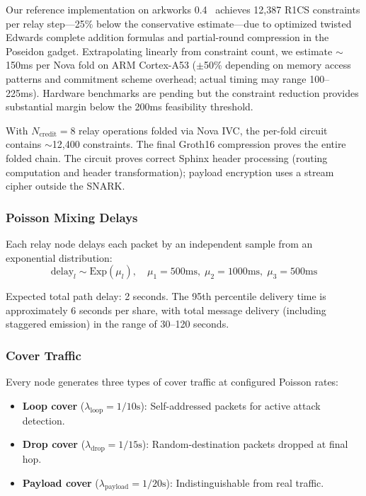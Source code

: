 \documentclass[11pt,a4paper]{article}
\begin{document}
Our reference implementation on arkworks 0.4~\cite{arkworks} achieves 12,387 R1CS constraints per relay step---25\% below the conservative estimate---due to optimized twisted Edwards complete addition formulas and partial-round compression in the Poseidon gadget. Extrapolating linearly from constraint count, we estimate $\sim$150ms per Nova fold on ARM Cortex-A53 ($\pm$50\% depending on memory access patterns and commitment scheme overhead; actual timing may range 100--225ms). Hardware benchmarks are pending but the constraint reduction provides substantial margin below the 200ms feasibility threshold.

With $N_{\text{credit}} = 8$ relay operations folded via Nova IVC, the per-fold circuit contains $\sim$12,400 constraints. The final Groth16 compression proves the entire folded chain. The circuit proves correct Sphinx header processing (routing computation and header transformation); payload encryption uses a stream cipher outside the SNARK.

\subsubsection{Poisson Mixing Delays}

Each relay node delays each packet by an independent sample from an exponential distribution:
\begin{equation}
    \text{delay}_l \sim \text{Exp}(\mu_l), \quad \mu_1 = 500\text{ms}, \; \mu_2 = 1000\text{ms}, \; \mu_3 = 500\text{ms}
\end{equation}

Expected total path delay: 2 seconds. The 95th percentile delivery time is approximately 6 seconds per share, with total message delivery (including staggered emission) in the range of 30--120 seconds.

\subsubsection{Cover Traffic}

Every node generates three types of cover traffic at configured Poisson rates:

\begin{itemize}[nosep]
    \item \textbf{Loop cover} ($\lambda_{\text{loop}} = 1/10\text{s}$): Self-addressed packets for active attack detection.
    \item \textbf{Drop cover} ($\lambda_{\text{drop}} = 1/15\text{s}$): Random-destination packets dropped at final hop.
    \item \textbf{Payload cover} ($\lambda_{\text{payload}} = 1/20\text{s}$): Indistinguishable from real traffic.
\end{itemize}
\end{document}
